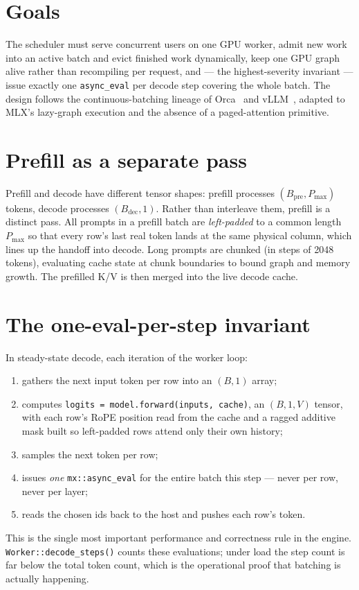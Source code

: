 \documentclass[11pt,a4paper]{report}
\newcommand{\code}[1]{\texttt{#1}}
\begin{document}
\section{Goals}
The scheduler must serve concurrent users on one GPU worker, admit new work into an
active batch and evict finished work dynamically, keep one GPU graph alive rather
than recompiling per request, and --- the highest-severity invariant --- issue
exactly one \code{async\_eval} per decode step covering the whole batch. The design
follows the continuous-batching lineage of Orca~\citep{yu2022orca} and
vLLM~\citep{kwon2023vllm}, adapted to MLX's lazy-graph execution and the absence of
a paged-attention primitive.

\section{Prefill as a separate pass}
Prefill and decode have different tensor shapes: prefill processes
$(B_{\text{pre}}, P_{\max})$ tokens, decode processes $(B_{\text{dec}}, 1)$.
Rather than interleave them, prefill is a distinct pass. All prompts in a prefill
batch are \emph{left-padded} to a common length $P_{\max}$ so that every row's last
real token lands at the same physical column, which lines up the handoff into
decode. Long prompts are chunked (in steps of 2048 tokens), evaluating cache state
at chunk boundaries to bound graph and memory growth. The prefilled K/V is then
merged into the live decode cache.

\section{The one-eval-per-step invariant}
In steady-state decode, each iteration of the worker loop:
\begin{enumerate}[nosep]
  \item gathers the next input token per row into an $(B,1)$ array;
  \item computes \code{logits = model.forward(inputs, cache)}, an $(B,1,V)$ tensor,
        with each row's RoPE position read from the cache and a ragged additive
        mask built so left-padded rows attend only their own history;
  \item samples the next token per row;
  \item issues \emph{one} \code{mx::async\_eval} for the entire batch this step ---
        never per row, never per layer;
  \item reads the chosen ids back to the host and pushes each row's token.
\end{enumerate}
This is the single most important performance and correctness rule in the engine.
\code{Worker::decode\_steps()} counts these evaluations; under load the step count
is far below the total token count, which is the operational proof that batching is
actually happening.
\end{document}
